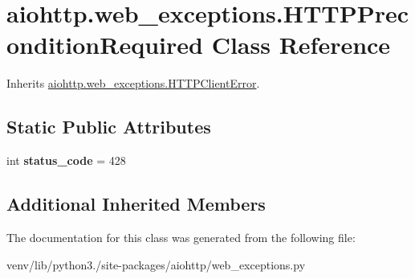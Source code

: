 \hypertarget{classaiohttp_1_1web__exceptions_1_1_h_t_t_p_precondition_required}{}\section{aiohttp.\+web\+\_\+exceptions.\+H\+T\+T\+P\+Precondition\+Required Class Reference}
\label{classaiohttp_1_1web__exceptions_1_1_h_t_t_p_precondition_required}


Inherits \hyperlink{classaiohttp_1_1web__exceptions_1_1_h_t_t_p_client_error}{aiohttp.\+web\+\_\+exceptions.\+H\+T\+T\+P\+Client\+Error}.

\subsection*{Static Public Attributes}
\begin{DoxyCompactItemize}
\item 
\mbox{\label{classaiohttp_1_1web__exceptions_1_1_h_t_t_p_precondition_required_a2f238c791b5144e79b7a022199ec45e8}} 
int {\bfseries status\+\_\+code} = 428
\end{DoxyCompactItemize}
\subsection*{Additional Inherited Members}


The documentation for this class was generated from the following file\+:\begin{DoxyCompactItemize}
\item 
venv/lib/python3./site-\/packages/aiohttp/web\+\_\+exceptions.\+py\end{DoxyCompactItemize}
